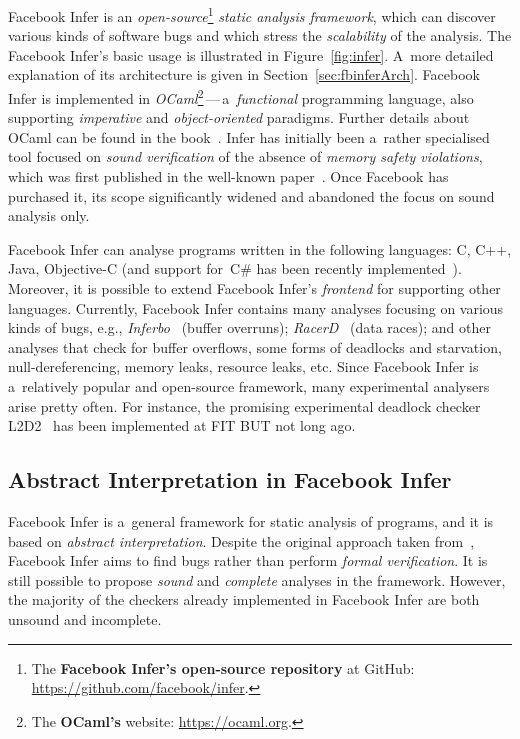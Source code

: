 Facebook Infer is an \emph{open-source}\footnote{The \textbf{Facebook Infer's open-source repository} at GitHub: \url{https://github.com/facebook/infer}.} \emph{static analysis framework}, which can discover various kinds of software bugs and which stress the \emph{scalability} of the analysis. The Facebook Infer's basic usage is illustrated in Figure~\ref{fig:infer}. A~more detailed explanation of its architecture is given in Section~\ref{sec:fbinferArch}. Facebook Infer is implemented in \emph{OCaml}\footnote{The \textbf{OCaml's} website: \url{https://ocaml.org}.}\,---\,a~\emph{functional} programming language, also supporting \emph{imperative} and \emph{object-oriented} paradigms. Further details about OCaml can be found in the book~\cite{realWorldOCaml}. Infer has initially been a~rather specialised tool focused on \emph{sound verification} of the absence of \emph{memory safety violations}, which was first published in the well-known paper~\cite{inferBiabduction}. Once Facebook has purchased it, its scope significantly widened and abandoned the focus on sound analysis only.

Facebook Infer can analyse programs written in the following languages: C, C++, Java, Objective-C (and support for~C\# has been recently implemented~\cite{inferCSharp}). Moreover, it is possible to extend Facebook Infer's \emph{frontend} for supporting other languages. Currently, Facebook Infer contains many analyses focusing on various kinds of bugs, e.g., \emph{Inferbo}~\cite{inferboOnline} (buffer overruns); \emph{RacerD}~\cite{racerD, racerDOnline, staticRaceDetectorTruePositives} (data races); and other analyses that check for buffer overflows, some forms of deadlocks and starvation, null-dereferencing, memory leaks, resource leaks, etc. Since Facebook Infer is a~relatively popular and open-source framework, many experimental analysers arise pretty often. For instance, the promising experimental deadlock checker L2D2~\cite{marcinBP} has been implemented at FIT BUT not long ago.

\subsection{Abstract Interpretation in Facebook Infer}
\label{sec:fbinferAI}

Facebook Infer is a~general framework for static analysis of programs, and it is based on \emph{abstract interpretation}. Despite the original approach taken from~\cite{inferBiabduction}, Facebook Infer aims to find bugs rather than perform \emph{formal verification}. It is still possible to propose \emph{sound} and \emph{complete} analyses in the framework. However, the majority of the checkers already implemented in Facebook Infer are both unsound and incomplete.

